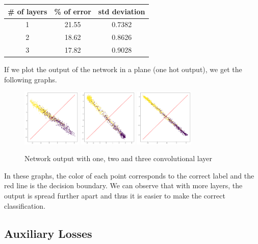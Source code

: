 \documentclass{article}
\begin{document}
\begin{center}
\begin{tabular}{|c|c|c|}
\hline 
\# of layers & \% of error & std deviation \\ 
\hline 
1 & 21.55 & 0.7382 \\ 
\hline 
2 & 18.62 & 0.8626 \\ 
\hline 
3 & 17.82 & 0.9028 \\ 
\hline 
\end{tabular}
\end{center} 

If we plot the output of the network in a plane (one hot output), we get the following graphs.

\begin{figure}[H]
\begin{center}
\includegraphics[width=0.25\textwidth]{ws_conv1}
\includegraphics[width=0.25\textwidth]{ws_conv2}
\includegraphics[width=0.25\textwidth]{ws_conv3}
\caption{Network output with one, two and three convolutional layer}
\end{center}
\end{figure}

In these graphs, the color of each point corresponds to the correct label and the red line is the decision boundary. We can observe that with more layers, the output is spread further apart and thus it is easier to make the correct classification.

\subsection{Auxiliary Losses}
\end{document}
